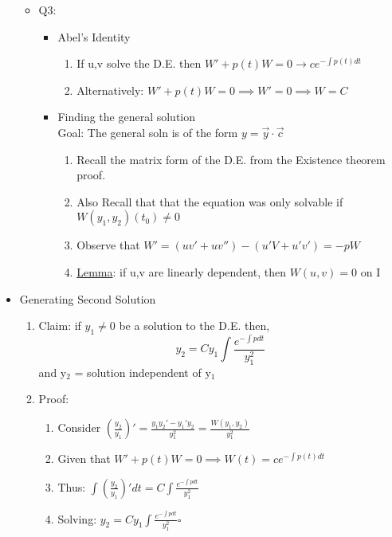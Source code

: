 \documentclass[11pt]{article}
\begin{document}
\begin{itemize}
\begin{itemize}
\item Q3:
\label{sec-9-2-4-3-3}%
\begin{itemize}

\item Abel's Identity
\label{sec-9-2-4-3-3-1}%
\begin{enumerate}
\item If u,v solve the D.E. then $W'+p(t)W=0 \rightarrow ce^{-\int p(t)dt}$
\item Alternatively: $W' +p(t)W=0 \implies W'=0 \implies W=C$
\end{enumerate}

\item Finding the general solution\\
\label{sec-9-2-4-3-3-2}%
Goal: The general soln is of the form $y=\vec{y}\cdot\vec{c}$
\begin{enumerate}
\item Recall the matrix form of the D.E. from the Existence theorem
         proof.
\item Also Recall that that the equation was only solvable if
         $W(y_1,y_2)(t_0)\neq 0$
\item Observe that $W'=(uv'+uv'')-(u'V+u'v') =-pW$
\item \underline{Lemma}: if u,v are linearly dependent, then $W(u,v)=0$ on I
\end{enumerate}
\end{itemize} %
\end{itemize} %

\item Generating Second Solution
\label{sec-9-2-4-4}%
\begin{enumerate}
\item Claim: if $y_1\neq 0$ be a solution to the D.E. then,
        \begin{equation}
        y_2 = Cy_1\int \frac{e^{-\int p dt}}{y_1^2}
        \end{equation}
        and y$_2$ = solution independent of y$_1$
\item Proof:
\begin{enumerate}
\item Consider $(\frac{y_2}{y_1})' = \frac{y_1 y_2' - y_1'y_2}{y_1^2}=\frac{W(y_1,y_2)}{y_1^2}$
\item Given that $W'+p(t)W=0 \implies W(t)=ce^{-\int p(t) dt}$
\item Thus: $\int (\frac{y_2}{y_1})'dt = C \int \frac{e^{-\int p
           dt}}{y_1^2}$
\item Solving: $y_2=Cy_1\int \frac{e^{-\int p
           dt}}{y_1^2} \square$
\end{enumerate}
\end{enumerate}
\end{itemize} %
\end{document}
